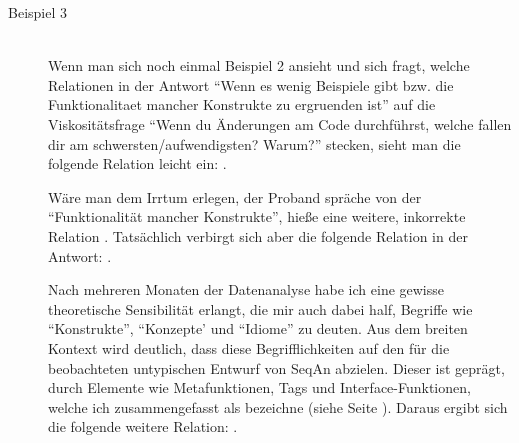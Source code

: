 \begin{description}
\begin{description}
    \item[Beispiel 3] \hfill \\
    Wenn man sich noch einmal Beispiel 2 ansieht und sich fragt, welche Relationen in der Antwort ``Wenn es wenig Beispiele gibt bzw. die Funktionalitaet mancher Konstrukte zu ergruenden ist''  auf die Viskositätsfrage ``Wenn du Änderungen am Code durchführst, welche fallen dir am schwersten/aufwendigsten? Warum?'' stecken, sieht man die folgende Relation leicht ein: .
    
    Wäre man dem Irrtum erlegen, der Proband spräche von der ``Funktionalität mancher Konstrukte'', hieße eine weitere, inkorrekte Relation . Tatsächlich verbirgt sich aber die folgende Relation in der Antwort: .
    
    Nach mehreren Monaten der Datenanalyse habe ich eine gewisse theoretische Sensibilität erlangt, die mir auch dabei half, Begriffe wie ``Konstrukte'', ``Konzepte' und ``Idiome'' zu deuten. Aus dem breiten Kontext wird deutlich, dass diese Begrifflichkeiten auf den für die beobachteten  untypischen Entwurf von SeqAn abzielen. Dieser ist geprägt, durch Elemente wie Metafunktionen, Tags und Interface-Funktionen, welche ich zusammengefasst als  bezeichne (siehe Seite \pageref{sec:gt-let}). Daraus ergibt sich die folgende weitere Relation: .
    

\end{description}
\end{description}
